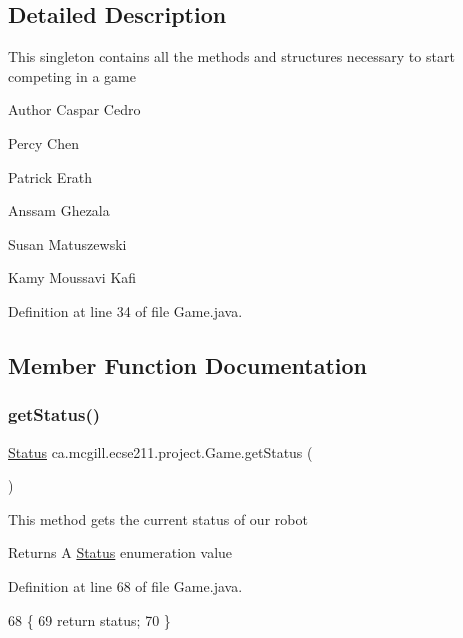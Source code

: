 \subsection{Detailed Description}
This singleton contains all the methods and structures necessary to start competing in a game

\begin{DoxyAuthor}{Author}
Caspar Cedro 

Percy Chen 

Patrick Erath 

Anssam Ghezala 

Susan Matuszewski 

Kamy Moussavi Kafi 
\end{DoxyAuthor}


Definition at line 34 of file Game.\+java.



\subsection{Member Function Documentation}
\mbox{\label{enumca_1_1mcgill_1_1ecse211_1_1project_1_1_game_a620374b3eeb3dd7e0abd26f3ced9053b}} 
\subsubsection{\texorpdfstring{get\+Status()}{getStatus()}}
{\footnotesize\ttfamily \hyperlink{enumca_1_1mcgill_1_1ecse211_1_1project_1_1_game_1_1_status}{Status} ca.\+mcgill.\+ecse211.\+project.\+Game.\+get\+Status (\begin{DoxyParamCaption}{ }\end{DoxyParamCaption})}

This method gets the current status of our robot

\begin{DoxyReturn}{Returns}
A \hyperlink{enumca_1_1mcgill_1_1ecse211_1_1project_1_1_game_1_1_status}{Status} enumeration value 
\end{DoxyReturn}


Definition at line 68 of file Game.\+java.


\begin{DoxyCode}
68                             \{
69     \textcolor{keywordflow}{return} status;
70   \}
\end{DoxyCode}
\mbox{\label{enumca_1_1mcgill_1_1ecse211_1_1project_1_1_game_a43a5763d183e0bcacd402c872c07273e}} 
